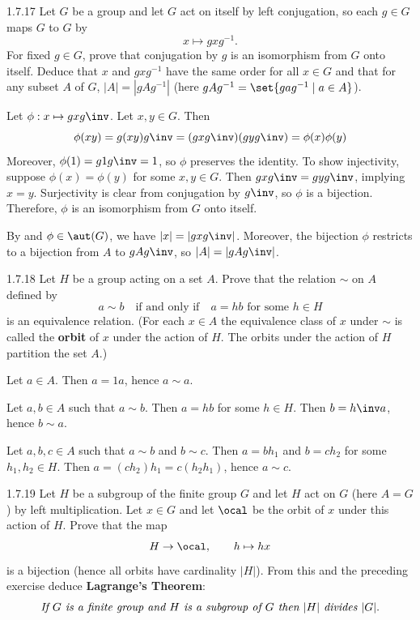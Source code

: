 \begin{exercise}{1.7.17}
    Let $G$ be a group and let $G$ act on itself by left conjugation, so each $g\in G$ maps $G$ to $G$ by
    \[
    	 x \mapsto gxg^{-1}. 
    \]
    For fixed $g\in G$, prove that conjugation by $g$ is an isomorphism from $G$ onto itself.
	Deduce that $x$ and $gxg^{-1}$ have the same order for all $x\in G$ and that for any subset $A$ of $G$, $|A| = |gAg^{-1}|$ (here $gAg^{-1} = \set{gag^{-1} \mid a\in A}$).
\end{exercise}

\begin{sol}
    Let $\phi : x \mapsto gxg\inv$.
	Let $x, y \in G$.
	Then
    \[
    	\phi(x y) = g(xy)g\inv = (gxg\inv)(gyg\inv) = \phi(x)\phi(y)
    \]
    Moreover, $\phi(1) = g1g\inv = 1$, so $\phi$ preserves the identity.
	To show injectivity, suppose $\phi(x) = \phi(y)$ for some $x, y \in G$.
	Then $gxg\inv = gyg\inv$, implying $x = y$.
	Surjectivity is clear from conjugation by $g\inv$, so $\phi$ is a bijection.
	Therefore, $\phi$ is an isomorphism from $G$ onto itself.

    By  and $\phi \in \aut(G)$, we have $|x| = |gxg\inv|$.
	Moreover, the bijection $\phi$ restricts to a bijection from $A$ to $gAg\inv$, so $|A| = |gAg\inv|$.
\end{sol}

\begin{exercise}{1.7.18}
    Let $H$ be a group acting on a set $A$.
	Prove that the relation $\sim$ on $A$ defined by  
    \[
    	a \sim b \quad \text{if and only if} \quad a = hb \text{ for some } h \in H
    \]
    is an equivalence relation. (For each $x\in A$ the equivalence class of $x$ under $\sim$ is called the \textbf{orbit} of $x$ under the action of $H$.
	The orbits under the action of $H$ partition the set $A$.)
\end{exercise}

\begin{solitem}
    \item Let $a \in A$.
	Then $a = 1a$, hence $a \sim a$.
    \item Let $a, b \in A$ such that $a \sim b$.
	Then $a = hb$ for some $h \in H$.
	Then $b = h\inv a$, hence $b \sim a$.
    \item Let $a, b, c \in A$ such that $a \sim b$ and $b \sim c$.
	Then $a = bh_1$ and $b = ch_2$ for some $h_1, h_2 \in H$.
	Then $a = (ch_2)h_1 = c(h_2h_1)$, hence $a \sim c$.
\end{solitem}

\begin{spex}{1.7.19}
    Let $H$ be a subgroup of the finite group $G$ and let $H$ act on $G$ (here $A = G$) by left multiplication.
	Let $x\in G$ and let $\ocal$ be the orbit of $x$ under this action of $H$.
	Prove that the map  
    \[
    	H \to \ocal, \qquad h \mapsto hx
    \]
    is a bijection (hence all orbits have cardinality $|H|$).
	From this and the preceding exercise deduce \textbf{Lagrange's Theorem}:  
    \[
    	\emph{If $G$ is a finite group and $H$ is a subgroup of $G$ then $|H|$ divides $|G|$}.
    \]
\end{spex}

